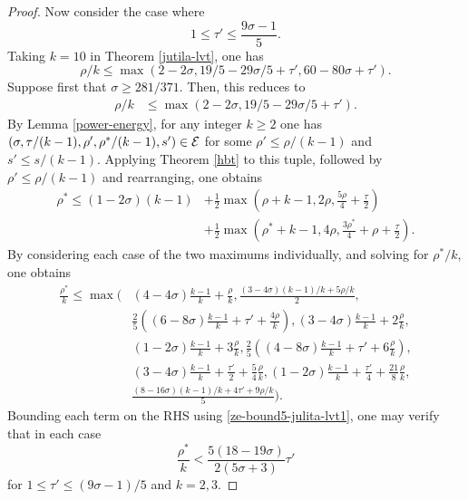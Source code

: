 \begin{proof}
Now consider the case where
\[
1 \le \tau' \le \frac{9\sigma - 1}{5}.
\]
Taking $k = 10$ in Theorem \ref{jutila-lvt}, one has
\begin{equation}\label{ze-bound5-julita-lvt}
\rho/k \le \max(2 - 2\sigma,  19/5 - 29\sigma/5 + \tau', 60 - 80\sigma + \tau').
\end{equation}
Suppose first that $\sigma \ge 281/371$. Then, this reduces to
\begin{equation}
\label{ze-bound5-julita-lvt1}
\begin{split}
\rho/k &\le \max(2 - 2\sigma, 19/5 - 29\sigma/5 + \tau').
\end{split}
\end{equation}
By Lemma \ref{power-energy}, for any integer $k \ge 2$ one has $(\sigma, \tau/(k - 1), \rho', \rho^*/(k - 1), s') \in \mathcal{E}$ for some $\rho' \le \rho/(k - 1)$ and $s' \le s/(k - 1)$. Applying Theorem \ref{hbt} to this tuple, followed by $\rho' \le \rho/(k - 1)$ and rearranging, one obtains
\begin{equation}\label{ze-bound5-rhostar-bound}
\begin{split}
\rho^* \le (1-2\sigma)(k - 1) &+ \frac{1}{2}\max(\rho+k - 1, 2\rho, \frac{5\rho}{4} + \frac{\tau}{2}) \\
&+ \frac{1}{2}\max(\rho^*+k - 1, 4\rho, \frac{3\rho^*}{4} + \rho+\frac{\tau}{2}).
\end{split}
\end{equation}
By considering each case of the two maximums individually, and solving for $\rho^*/k$, one obtains
\begin{equation}\label{ze-bound5-rhostar-bound3}
\begin{split}
\frac{\rho^*}{k} \le \max\bigg(&(4 - 4\sigma)\frac{k - 1}{k} + \frac{\rho}{k}, \frac{(3 - 4\sigma)(k - 1)/k + 5\rho/k}{2}, \\
&\frac{2}{5}((6 - 8\sigma)\frac{k - 1}{k} + \tau' + \frac{4\rho}{k}), (3 - 4\sigma)\frac{k - 1}{k} + 2\frac{\rho}{k}, \\
&(1 - 2\sigma)\frac{k - 1}{k} + 3\frac{\rho}{k}, \frac{2}{5}((4 - 8\sigma)\frac{k - 1}{k} + \tau' + 6\frac{\rho}{k}),\\
&(3 - 4\sigma)\frac{k - 1}{k} + \frac{\tau'}{2} + \frac{5}{4}\frac{\rho}{k}, (1 - 2\sigma)\frac{k - 1}{k} + \frac{\tau'}{4} + \frac{21}{8}\frac{\rho}{k}, \\
&\frac{(8 - 16\sigma)(k - 1)/k + 4\tau' + 9\rho/k}{5}\bigg).
\end{split}
\end{equation}
Bounding each term on the RHS using \eqref{ze-bound5-julita-lvt1}, one may verify that in each case
\[
\frac{\rho^*}{k} < \frac{5(18 - 19\sigma)}{2(5\sigma + 3)}\tau'
\]
for $1 \le \tau' \le (9\sigma - 1)/5$ and $k = 2,3$.


\end{proof}
